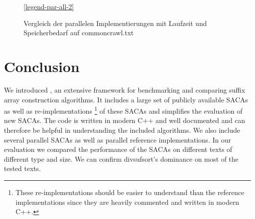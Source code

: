 \begin{figure}[!h]

    \medskip
    \ref{legend-par-all-2}
    \caption{Vergleich der parallelen Implementierungen mit Laufzeit und Speicherbedarf auf commoncrawl.txt}
    \label{fig-par-all-2}
\end{figure}
\FloatBarrier

\blindtext

\section{Conclusion}

We introduced \sacabench, an extensive framework for benchmarking and comparing suffix array construction algorithms.
It includes a large set of publicly available SACAs as well as re-implementations%
\footnote{These re-implementations should be easier to understand than the reference implementations since they are heavily commented and written in modern C++.}
of these SACAs and simplifies the evaluation of new SACAs.
The code is written in modern C++ and well documented and can therefore be helpful in understanding the included algorithms.
We also include several parallel SACAs as well as parallel reference implementations.
In our evaluation we compared the performance of the SACAs on different texts of different type and size.
We can confirm divsufsort's dominance on most of the tested texts.

